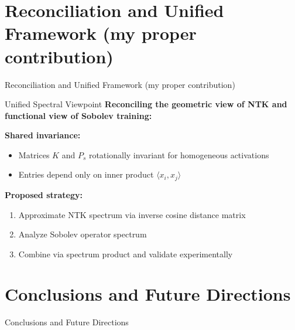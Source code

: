 \documentclass{beamer}
\begin{document}
\section{Reconciliation and Unified Framework (my proper contribution)}

\begin{frame}
\begin{center}
\huge{Reconciliation and Unified Framework}
\vspace{0.5cm}
\large{(my proper contribution)}
\end{center}
\end{frame}

\begin{frame}{Unified Spectral Viewpoint}
\textbf{Reconciling the geometric view of NTK and functional view of Sobolev training:}

\textbf{Shared invariance:}
\begin{itemize}
\item Matrices $K$ and $P_s$ rotationally invariant for homogeneous activations
\item Entries depend only on inner product $\langle x_i, x_j \rangle$
\end{itemize}

\textbf{Proposed strategy:}
\begin{enumerate}
\item Approximate NTK spectrum via inverse cosine distance matrix
\item Analyze Sobolev operator spectrum
\item Combine via spectrum product and validate experimentally
\end{enumerate}
\end{frame}


\section{Conclusions and Future Directions}

\begin{frame}
\begin{center}
\huge{Conclusions and Future Directions}
\end{center}
\end{frame}
\end{document}
